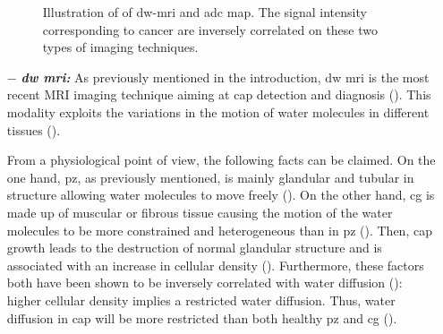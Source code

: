\begin{enumerate}[leftmargin=*]
\begin{figure}
\centering
	\hspace*{\fill}
	 \hfill
	\hspace*{\fill}
	\caption{Illustration of of \ac{dw}-\ac{mri} and \ac{adc} map. The signal intensity corresponding to cancer are inversely correlated on these two types of imaging techniques.}
	\label{fig:dwi}
\end{figure}

\item[$-$] \textbf{\textit{\ac{dw} \ac{mri}:}} As previously mentioned in the introduction, \ac{dw} \ac{mri} is the most recent MRI imaging technique aiming at \ac{cap} detection and diagnosis (\cite{Scheidler1999}). This modality exploits the variations in the motion of water molecules in different tissues (\cite{LeBihan1988,Koh2007}).

From a physiological point of view, the following facts can be claimed. On the one hand, \ac{pz}, as previously mentioned, is mainly glandular and tubular in structure allowing water molecules to move freely (\cite{Choi2007,Hoeks2011}). On the other hand, \ac{cg} is made up of muscular or fibrous tissue causing the motion of the water molecules to be more constrained and heterogeneous than in \ac{pz} (\cite{Hoeks2011}). Then, \ac{cap} growth leads to the destruction of normal glandular structure and is associated with an increase in cellular density (\cite{Hoeks2011,Koh2007,Somford2008}). Furthermore, these factors both have been shown to be inversely correlated with water diffusion (\cite{Koh2007,Somford2008}): higher cellular density implies a restricted water diffusion. Thus, water diffusion in \ac{cap} will be more restricted than both healthy \ac{pz} and \ac{cg} (\cite{Koh2007,Hoeks2011}).


\end{enumerate}
